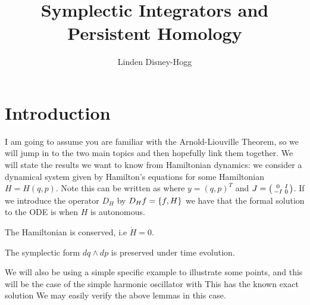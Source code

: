\documentclass{article}
\title{Symplectic Integrators and Persistent Homology}
\author{Linden Disney-Hogg}
\date{}
\begin{document}
\maketitle
\tableofcontents

\section{Introduction}
I am going to assume you are familiar with the Arnold-Liouville Theorem, so we will jump in to the two main topics and then hopefully link them together. We will state the results we want to know from Hamiltonian dynamics: we consider a dynamical system given by Hamilton's equations 
for some Hamiltonian $H=H(q,p)$. Note this can be written as 
where $y=(q,p)^T$ and $J = \begin{psmallmatrix} 0 & I \\ -I & 0 \end{psmallmatrix}$. If we introduce the operator $D_H$ by $D_H f = \acomm[f]{H}$ we have that the formal solution to the ODE is 
when $H$ is autonomous. 
\begin{lemma}
	The Hamiltonian is conserved, i.e $\dot{H}=0$. 
\end{lemma}

\begin{lemma}
	The symplectic form $dq \wedge dp$ is preserved under time evolution. 
\end{lemma}


We will also be using a simple specific example to illustrate some points, and this will be the case of the simple harmonic oscillator with 
This has the known exact solution 
We may easily verify the above lemmas in this case. 
\end{document}
